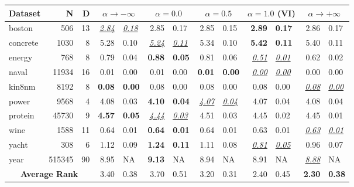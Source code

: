 \centering
{}
\label{tab:chap4_vrbound_bnn_rmse}
\begin{tabular}{l@{\ica}r@{\ica}r@{\ica}r@{$\pm$}l@{\ica}r@{$\pm$}l@{\ica}r@{$\pm$}l@{\ica}r@{$\pm$}l@{\ica}r@{$\pm$}l@{\ica}}
\hline
\bf{Dataset}&{N}&{D}&\multicolumn{2}{c}{\bf{$\alpha \rightarrow -\infty$}}&\multicolumn{2}{c}{\bf{$\alpha = 0.0$}}&\multicolumn{2}{c}{\bf{$\alpha = 0.5$}}&\multicolumn{2}{c}{\bf{$\alpha = 1.0$ (VI)}}&\multicolumn{2}{c}{\bf{$\alpha \rightarrow +\infty$}}\\
\hline
boston&506&13&\underline{\textit{2.84}}&\underline{\textit{0.18}}&2.85&0.17&2.85&0.15&\textbf{2.89}&\textbf{0.17}&2.86&0.17\\
concrete&1030&8&5.28&0.10&\underline{\textit{5.24}}&\underline{\textit{0.11}}&5.34&0.10&\textbf{5.42}&\textbf{0.11}&5.40&0.11\\
energy&768&8&0.79&0.04&\textbf{0.88}&\textbf{0.05}&0.81&0.06&\underline{\textit{0.51}}&\underline{\textit{0.01}}&0.62&0.02\\
naval&11934&16&0.01&0.00&0.01&0.00&\textbf{0.01}&\textbf{0.00}&\underline{\textit{0.00}}&\underline{\textit{0.00}}&0.00&0.00\\
kin8nm&8192&8&\textbf{0.08}&\textbf{0.00}&0.08&0.00&0.08&0.00&0.08&0.00&\underline{\textit{0.08}}&\underline{\textit{0.00}}\\
power&9568&4&4.08&0.03&\textbf{4.10}&\textbf{0.04}&\underline{\textit{4.07}}&\underline{\textit{0.04}}&4.07&0.04&4.08&0.04\\
protein&45730&9&\textbf{4.57}&\textbf{0.05}&\underline{\textit{4.44}}&\underline{\textit{0.03}}&4.51&0.03&4.45&0.02&4.45&0.01\\
wine&1588&11&0.64&0.01&\textbf{0.64}&\textbf{0.01}&0.64&0.01&0.63&0.01&\underline{\textit{0.63}}&\underline{\textit{0.01}}\\
yacht&308&6&1.12&0.09&\textbf{1.24}&\textbf{0.11}&1.11&0.08&\underline{\textit{0.81}}&\underline{\textit{0.05}}&0.96&0.07\\
year&515345&90&8.95&NA&\textbf{9.13}&NA&8.94&NA&8.91&NA&\underline{\textit{8.88}}&NA\\
\hline
\multicolumn{3}{c}{\textbf{Average Rank}}&3.40&0.38&3.70&0.51&3.20&0.31&2.40&0.45&\textbf{2.30}&\textbf{0.38}\\
\hline
\end{tabular}
